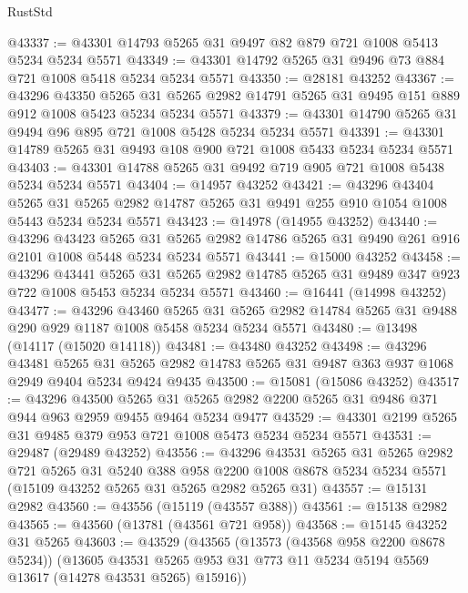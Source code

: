 \begin{lexlean}{RustStd}
\begin{coremodule}
@43337 := @43301 @14793 @5265 @31 @9497 @82 @879 @721 @1008 @5413 @5234 @5234 @5571
@43349 := @43301 @14792 @5265 @31 @9496 @73 @884 @721 @1008 @5418 @5234 @5234 @5571
@43350 := @28181 @43252
@43367 := @43296
    @43350
    @5265
    @31
    @5265
    @2982
    @14791
    @5265
    @31
    @9495
    @151
    @889
    @912
    @1008
    @5423
    @5234
    @5234
    @5571
@43379 := @43301 @14790 @5265 @31 @9494 @96 @895 @721 @1008 @5428 @5234 @5234 @5571
@43391 := @43301 @14789 @5265 @31 @9493 @108 @900 @721 @1008 @5433 @5234 @5234 @5571
@43403 := @43301 @14788 @5265 @31 @9492 @719 @905 @721 @1008 @5438 @5234 @5234 @5571
@43404 := @14957 @43252
@43421 := @43296
    @43404
    @5265
    @31
    @5265
    @2982
    @14787
    @5265
    @31
    @9491
    @255
    @910
    @1054
    @1008
    @5443
    @5234
    @5234
    @5571
@43423 := @14978 (@14955 @43252)
@43440 := @43296
    @43423
    @5265
    @31
    @5265
    @2982
    @14786
    @5265
    @31
    @9490
    @261
    @916
    @2101
    @1008
    @5448
    @5234
    @5234
    @5571
@43441 := @15000 @43252
@43458 := @43296
    @43441
    @5265
    @31
    @5265
    @2982
    @14785
    @5265
    @31
    @9489
    @347
    @923
    @722
    @1008
    @5453
    @5234
    @5234
    @5571
@43460 := @16441 (@14998 @43252)
@43477 := @43296
    @43460
    @5265
    @31
    @5265
    @2982
    @14784
    @5265
    @31
    @9488
    @290
    @929
    @1187
    @1008
    @5458
    @5234
    @5234
    @5571
@43480 := @13498 (@14117 (@15020 @14118))
@43481 := @43480 @43252
@43498 := @43296
    @43481
    @5265
    @31
    @5265
    @2982
    @14783
    @5265
    @31
    @9487
    @363
    @937
    @1068
    @2949
    @9404
    @5234
    @9424
    @9435
@43500 := @15081 (@15086 @43252)
@43517 := @43296
    @43500
    @5265
    @31
    @5265
    @2982
    @2200
    @5265
    @31
    @9486
    @371
    @944
    @963
    @2959
    @9455
    @9464
    @5234
    @9477
@43529 := @43301 @2199 @5265 @31 @9485 @379 @953 @721 @1008 @5473 @5234 @5234 @5571
@43531 := @29487 (@29489 @43252)
@43556 := @43296
    @43531
    @5265
    @31
    @5265
    @2982
    @721
    @5265
    @31
    @5240
    @388
    @958
    @2200
    @1008
    @8678
    @5234
    @5234
    @5571
    (@15109 @43252 @5265 @31 @5265 @2982 @5265 @31)
@43557 := @15131 @2982
@43560 := @43556 (@15119 (@43557 @388))
@43561 := @15138 @2982
@43565 := @43560 (@13781 (@43561 @721 @958))
@43568 := @15145 @43252 @31 @5265
@43603 := @43529
    (@43565
      (@13573 (@43568 @958 @2200 @8678 @5234))
      (@13605 @43531 @5265 @953 @31 @773 @11 @5234 @5194 @5569 @13617 (@14278 @43531 @5265) @15916))

\end{coremodule}
\end{lexlean}
